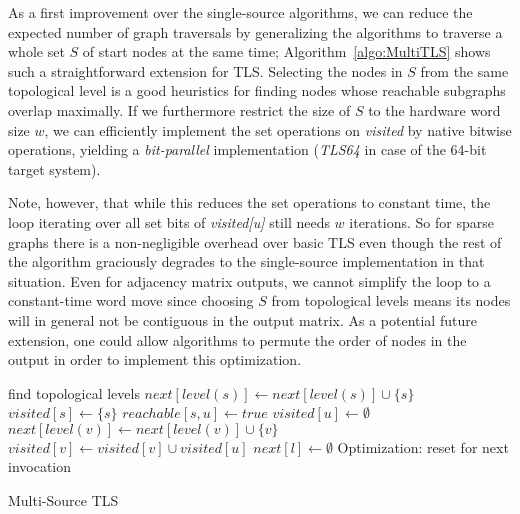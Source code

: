 \documentclass[12pt,a4paper,twoside]{article}
\begin{document}
As a first improvement over the single-source algorithms, we can reduce the expected number of graph traversals by generalizing the algorithms to traverse a whole set $S$ of start nodes at the same time; Algorithm~\ref{algo:MultiTLS} shows such a straightforward extension for TLS. Selecting the nodes in $S$ from the same topological level is a good heuristics for finding nodes whose reachable subgraphs overlap maximally. If we furthermore restrict the size of $S$ to the hardware word size $w$, we can efficiently implement the set operations on \emph{visited} by native bitwise operations, yielding a \emph{bit-parallel} implementation (\emph{TLS64} in case of the 64-bit target system).

Note, however, that while this reduces the set operations to constant time, the loop iterating over all set bits of \emph{visited[u]} still needs $w$ iterations. So for sparse graphs there is a non-negligible overhead over basic TLS even though the rest of the algorithm graciously degrades to the single-source implementation in that situation. Even for adjacency matrix outputs, we cannot simplify the loop to a constant-time word move since choosing $S$ from topological levels means its nodes will in general not be contiguous in the output matrix. As a potential future extension, one could allow algorithms to permute the order of nodes in the output in order to implement this optimization.

\begin{algorithm}
  \begin{algorithmic}
      \State find topological levels
        \State $next[level(s)] \gets next[level(s)] \cup \{s\}$
        \State $visited[s] \gets \{s\}$
      \EndFor
            \State $reachable[s, u] \gets true$
          \EndFor
          \State $visited[u] \gets \emptyset$
              \State $next[level(v)] \gets next[level(v)] \cup \{v\}$
            \EndIf
            \State $visited[v] \gets visited[v] \cup visited[u]$
          \EndFor
        \EndFor
        \State $next[l] \gets \emptyset$ \Comment Optimization: reset for next invocation
      \EndFor
    \EndFunction
  \end{algorithmic}
  \caption{Multi-Source TLS}
  \label{algo:MultiTLS}
\end{algorithm}
\end{document}
